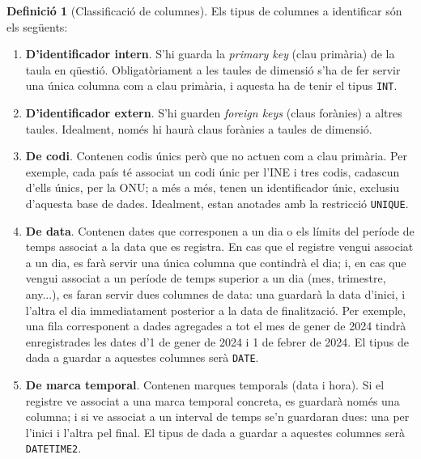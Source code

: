 \documentclass{article}
\theoremstyle{definition}
\newtheorem{definition}{Definició}
\begin{document}
\begin{definition}[Classificació de columnes]\label{def:columns:classification}
  Els tipus de columnes a identificar són els següents:
  \begin{enumerate}
    \item \textbf{D'identificador intern}. S'hi guarda la \emph{primary key} (clau primària) de la taula en qüestió. Obligatòriament a les taules de dimensió s'ha de fer servir una única columna com a clau primària, i aquesta ha de tenir el tipus \verb|INT|.

    \item \textbf{D'identificador extern}. S'hi guarden \emph{foreign keys} (claus forànies) a altres taules. Idealment, només hi haurà claus forànies a taules de dimensió.

    \item \textbf{De codi}. Contenen codis únics però que no actuen com a clau primària. Per exemple, cada país té associat un codi únic per l'INE i tres codis, cadascun d'ells únics, per la ONU; a més a més, tenen un identificador únic, exclusiu d'aquesta base de dades. Idealment, estan anotades amb la restricció \verb|UNIQUE|.

    \item \textbf{De data}. Contenen dates que corresponen a un dia o els límits del període de temps associat a la data que es registra. En cas que el registre vengui associat a un dia, es farà servir una única columna que contindrà el dia; i, en cas que vengui associat a un període de temps superior a un dia (mes, trimestre, any...), es faran servir dues columnes de data: una guardarà la data d'inici, i l'altra el dia immediatament posterior a la data de finalització. Per exemple, una fila corresponent a dades agregades a tot el mes de gener de 2024 tindrà enregistrades les dates d'1 de gener de 2024 i 1 de febrer de 2024. El tipus de dada a guardar a aquestes columnes serà \verb|DATE|.

    \item \textbf{De marca temporal}. Contenen marques temporals (data i hora). Si el registre ve associat a una marca temporal concreta, es guardarà només una columna; i si ve associat a un interval de temps se'n guardaran dues: una per l'inici i l'altra pel final. El tipus de dada a guardar a aquestes columnes serà \verb|DATETIME2|.


\end{enumerate}
\end{definition}
\end{document}
